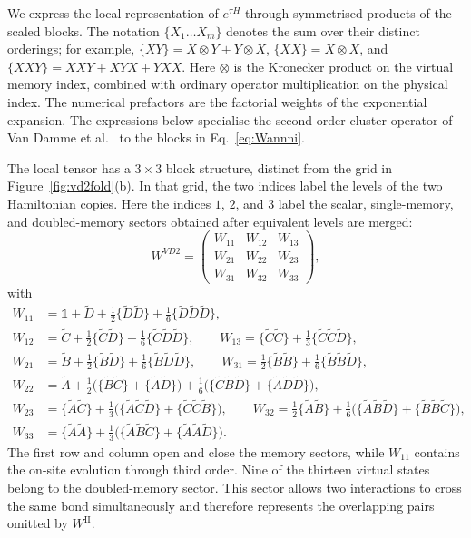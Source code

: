 We express the local representation of $e^{\tau H}$ through symmetrised products of the scaled blocks. The notation $\{X_1\dots X_m\}$ denotes the sum over their distinct orderings; for example, $\{XY\}=X\otimes Y+Y\otimes X$, $\{XX\}=X\otimes X$, and $\{XXY\}=XXY+XYX+YXX$. Here $\otimes$ is the Kronecker product on the virtual memory index, combined with ordinary operator multiplication on the physical index. The numerical prefactors are the factorial weights of the exponential expansion. The expressions below specialise the second-order cluster operator of Van Damme et al.~\cite{vandamme2024} to the blocks in Eq.~\eqref{eq:Wannni}.

The local tensor has a $3\times3$ block structure, distinct from the grid in Figure~\ref{fig:vd2fold}(b). In that grid, the two indices label the levels of the two Hamiltonian copies. Here the indices $1$, $2$, and $3$ label the scalar, single-memory, and doubled-memory sectors obtained after equivalent levels are merged:
\begin{equation}
  W^{\textit{VD2}} =
  \begin{pmatrix}
    W_{11} & W_{12} & W_{13} \\
    W_{21} & W_{22} & W_{23} \\
    W_{31} & W_{32} & W_{33}
  \end{pmatrix},
\end{equation}
with
\begin{align}
  W_{11} & = \mathbb{1} + \tilde D + \tfrac12\{\tilde D\tilde D\} + \tfrac16\{\tilde D\tilde D\tilde D\},               \\
  W_{12} & = \tilde C + \tfrac12\{\tilde C\tilde D\} + \tfrac16\{\tilde C\tilde D\tilde D\}, \qquad
  W_{13} = \{\tilde C\tilde C\} + \tfrac13\{\tilde C\tilde C\tilde D\},                                                 \\
  W_{21} & = \tilde B + \tfrac12\{\tilde B\tilde D\} + \tfrac16\{\tilde B\tilde D\tilde D\}, \qquad
  W_{31} = \tfrac12\{\tilde B\tilde B\} + \tfrac16\{\tilde B\tilde B\tilde D\},                                         \\
  W_{22} & = \tilde A + \tfrac12\big(\{\tilde B\tilde C\}+\{\tilde A\tilde D\}\big)
  + \tfrac16\big(\{\tilde C\tilde B\tilde D\}+\{\tilde A\tilde D\tilde D\}\big),                                        \\
  W_{23} & = \{\tilde A\tilde C\} + \tfrac13\big(\{\tilde A\tilde C\tilde D\}+\{\tilde C\tilde C\tilde B\}\big), \qquad
  W_{32} = \tfrac12\{\tilde A\tilde B\} + \tfrac16\big(\{\tilde A\tilde B\tilde D\}+\{\tilde B\tilde B\tilde C\}\big),  \\
  W_{33} & = \{\tilde A\tilde A\} + \tfrac13\big(\{\tilde A\tilde B\tilde C\}+\{\tilde A\tilde A\tilde D\}\big).
\end{align}
The first row and column open and close the memory sectors, while $W_{11}$ contains the on-site evolution through third order. Nine of the thirteen virtual states belong to the doubled-memory sector. This sector allows two interactions to cross the same bond simultaneously and therefore represents the overlapping pairs omitted by $W^{\mathrm{II}}$.


